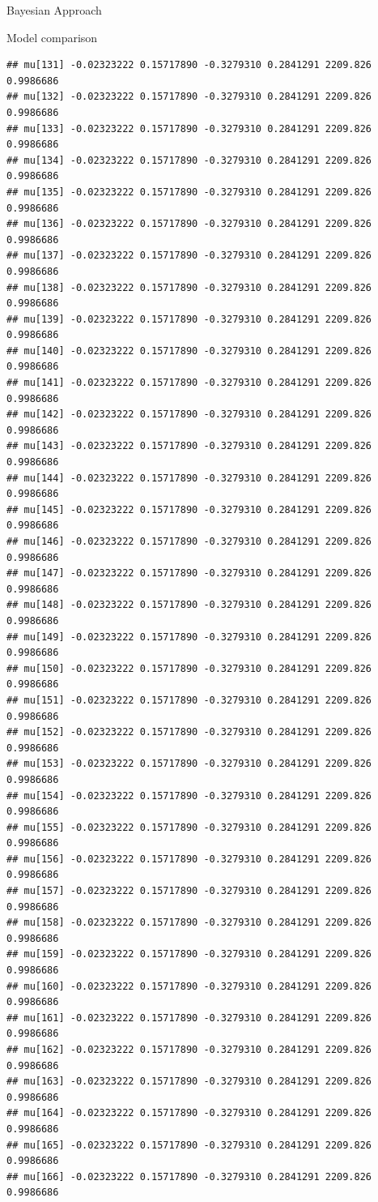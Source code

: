 \documentclass[
  ignorenonframetext,
]{beamer}
\begin{document}
\begin{frame}[fragile]{Bayesian Approach}
\begin{block}{Model comparison}
\begin{verbatim}
## mu[131] -0.02323222 0.15717890 -0.3279310 0.2841291 2209.826 0.9986686
## mu[132] -0.02323222 0.15717890 -0.3279310 0.2841291 2209.826 0.9986686
## mu[133] -0.02323222 0.15717890 -0.3279310 0.2841291 2209.826 0.9986686
## mu[134] -0.02323222 0.15717890 -0.3279310 0.2841291 2209.826 0.9986686
## mu[135] -0.02323222 0.15717890 -0.3279310 0.2841291 2209.826 0.9986686
## mu[136] -0.02323222 0.15717890 -0.3279310 0.2841291 2209.826 0.9986686
## mu[137] -0.02323222 0.15717890 -0.3279310 0.2841291 2209.826 0.9986686
## mu[138] -0.02323222 0.15717890 -0.3279310 0.2841291 2209.826 0.9986686
## mu[139] -0.02323222 0.15717890 -0.3279310 0.2841291 2209.826 0.9986686
## mu[140] -0.02323222 0.15717890 -0.3279310 0.2841291 2209.826 0.9986686
## mu[141] -0.02323222 0.15717890 -0.3279310 0.2841291 2209.826 0.9986686
## mu[142] -0.02323222 0.15717890 -0.3279310 0.2841291 2209.826 0.9986686
## mu[143] -0.02323222 0.15717890 -0.3279310 0.2841291 2209.826 0.9986686
## mu[144] -0.02323222 0.15717890 -0.3279310 0.2841291 2209.826 0.9986686
## mu[145] -0.02323222 0.15717890 -0.3279310 0.2841291 2209.826 0.9986686
## mu[146] -0.02323222 0.15717890 -0.3279310 0.2841291 2209.826 0.9986686
## mu[147] -0.02323222 0.15717890 -0.3279310 0.2841291 2209.826 0.9986686
## mu[148] -0.02323222 0.15717890 -0.3279310 0.2841291 2209.826 0.9986686
## mu[149] -0.02323222 0.15717890 -0.3279310 0.2841291 2209.826 0.9986686
## mu[150] -0.02323222 0.15717890 -0.3279310 0.2841291 2209.826 0.9986686
## mu[151] -0.02323222 0.15717890 -0.3279310 0.2841291 2209.826 0.9986686
## mu[152] -0.02323222 0.15717890 -0.3279310 0.2841291 2209.826 0.9986686
## mu[153] -0.02323222 0.15717890 -0.3279310 0.2841291 2209.826 0.9986686
## mu[154] -0.02323222 0.15717890 -0.3279310 0.2841291 2209.826 0.9986686
## mu[155] -0.02323222 0.15717890 -0.3279310 0.2841291 2209.826 0.9986686
## mu[156] -0.02323222 0.15717890 -0.3279310 0.2841291 2209.826 0.9986686
## mu[157] -0.02323222 0.15717890 -0.3279310 0.2841291 2209.826 0.9986686
## mu[158] -0.02323222 0.15717890 -0.3279310 0.2841291 2209.826 0.9986686
## mu[159] -0.02323222 0.15717890 -0.3279310 0.2841291 2209.826 0.9986686
## mu[160] -0.02323222 0.15717890 -0.3279310 0.2841291 2209.826 0.9986686
## mu[161] -0.02323222 0.15717890 -0.3279310 0.2841291 2209.826 0.9986686
## mu[162] -0.02323222 0.15717890 -0.3279310 0.2841291 2209.826 0.9986686
## mu[163] -0.02323222 0.15717890 -0.3279310 0.2841291 2209.826 0.9986686
## mu[164] -0.02323222 0.15717890 -0.3279310 0.2841291 2209.826 0.9986686
## mu[165] -0.02323222 0.15717890 -0.3279310 0.2841291 2209.826 0.9986686
## mu[166] -0.02323222 0.15717890 -0.3279310 0.2841291 2209.826 0.9986686

\end{verbatim}
\end{block}
\end{frame}
\end{document}
